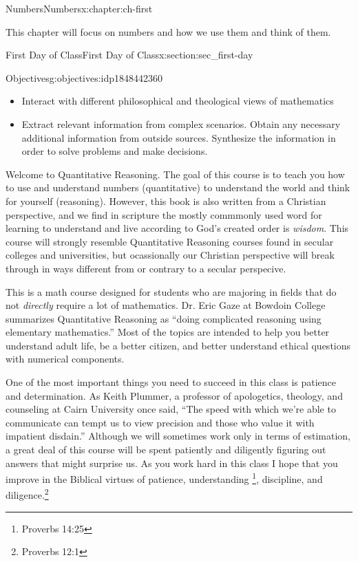 \documentclass[twoside,10pt,]{book}
\numberwithin{equation}{chapter}
\begin{document}
\begin{chapterptx}{Numbers}{}{Numbers}{}{}{x:chapter:ch-first}
\begin{introduction}{}%
This chapter will focus on numbers and how we use them and think of them.%
\end{introduction}%
%
%
\typeout{************************************************}
\typeout{************************************************}
%
\begin{sectionptx}{First Day of Class}{}{First Day of Class}{}{}{x:section:sec_first-day}
\begin{objectives}{Objectives}{g:objectives:idp1848442360}
%
\begin{itemize}[label=\textbullet]
\item{}Interact with different philosophical and theological views of mathematics%
\item{}Extract relevant information from complex scenarios. Obtain any necessary additional information from outside sources. Synthesize the information in order to solve problems and make decisions.%
\end{itemize}
\end{objectives}
\begin{introduction}{}%
Welcome to Quantitative Reasoning.  The goal of this course is to teach you how to use and understand numbers (quantitative) to understand the world and think for yourself (reasoning).  However, this book is also written from a Christian perspective, and we find in scripture the mostly commmonly used word for learning to understand and live according to God's created order is \emph{wisdom}.  This course will strongly resemble Quantitative Reasoning courses found in secular colleges and universities, but ocassionally our Christian perspective will break through in ways different from or contrary to a secular perspecive.%
\par
This is a math course designed for students who are majoring in fields that do not \emph{directly} require a lot of mathematics.  Dr. Eric Gaze at Bowdoin College summarizes Quantitative Reasoning as ``doing complicated reasoning using elementary mathematics.''  Most of the topics are intended to help you better understand adult life, be a better citizen, and better understand ethical questions with numerical components.%
\par
One of the most important things you need to succeed in this class is patience and determination.  As Keith Plummer, a professor of apologetics, theology, and counseling at Cairn University once said, ``The speed with which we're able to communicate can tempt us to view precision and those who value it with impatient disdain.'' Although we will sometimes work only in terms of estimation, a great deal of this course will be spent patiently and diligently figuring out answers that might surprise us.  As you work hard in this class I hope that you improve in the Biblical virtues of patience, understanding \footnote{Proverbs 14:25\label{g:fn:idp1848452216}}, discipline, and diligence.\footnote{Proverbs 12:1\label{g:fn:idp1848455416}}%

\end{introduction}
\end{sectionptx}
\end{chapterptx}
\end{document}
